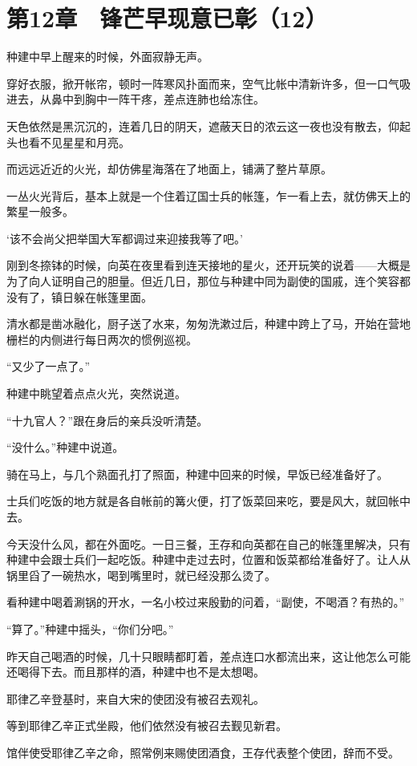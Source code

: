 \section{第12章　锋芒早现意已彰（12）}

种建中早上醒来的时候，外面寂静无声。

穿好衣服，掀开帐帘，顿时一阵寒风扑面而来，空气比帐中清新许多，但一口气吸进去，从鼻中到胸中一阵干疼，差点连肺也给冻住。

天色依然是黑沉沉的，连着几日的阴天，遮蔽天日的浓云这一夜也没有散去，仰起头也看不见星星和月亮。

而远远近近的火光，却仿佛星海落在了地面上，铺满了整片草原。

一丛火光背后，基本上就是一个住着辽国士兵的帐篷，乍一看上去，就仿佛天上的繁星一般多。

‘该不会尚父把举国大军都调过来迎接我等了吧。’

刚到冬捺钵的时候，向英在夜里看到连天接地的星火，还开玩笑的说着——大概是为了向人证明自己的胆量。但近几日，那位与种建中同为副使的国戚，连个笑容都没有了，镇日躲在帐篷里面。

清水都是凿冰融化，厨子送了水来，匆匆洗漱过后，种建中跨上了马，开始在营地栅栏的内侧进行每日两次的惯例巡视。

“又少了一点了。”

种建中眺望着点点火光，突然说道。

“十九官人？”跟在身后的亲兵没听清楚。

“没什么。”种建中说道。

骑在马上，与几个熟面孔打了照面，种建中回来的时候，早饭已经准备好了。

士兵们吃饭的地方就是各自帐前的篝火便，打了饭菜回来吃，要是风大，就回帐中去。

今天没什么风，都在外面吃。一日三餐，王存和向英都在自己的帐篷里解决，只有种建中会跟士兵们一起吃饭。种建中走过去时，位置和饭菜都给准备好了。让人从锅里舀了一碗热水，喝到嘴里时，就已经没那么烫了。

看种建中喝着涮锅的开水，一名小校过来殷勤的问着，“副使，不喝酒？有热的。”

“算了。”种建中摇头，“你们分吧。”

昨天自己喝酒的时候，几十只眼睛都盯着，差点连口水都流出来，这让他怎么可能还喝得下去。而且那样的酒，种建中也不是太想喝。

耶律乙辛登基时，来自大宋的使团没有被召去观礼。

等到耶律乙辛正式坐殿，他们依然没有被召去觐见新君。

馆伴使受耶律乙辛之命，照常例来赐使团酒食，王存代表整个使团，辞而不受。

